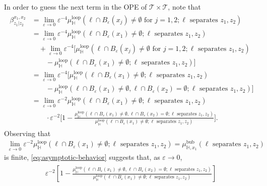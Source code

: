 \documentclass[a4paper,11pt]{article}
\begin{document}
In order to guess the next term in the OPE of $\mathcal{T} \times \mathcal{T}$, note that
\begin{align}
\begin{split}
    \beta^{x_1,x_2}_{z_1|z_2} &= \lim_{\varepsilon \to 0} \varepsilon^{-4} \mu_{\mathbb{H}}^{\text{loop}}(\ell \cap B_{\varepsilon}(x_j) \neq \emptyset \text{ for } j=1,2; \ell \text{ separates } z_1,z_2) \\
    &= \lim_{\varepsilon \to 0} \varepsilon^{-4} \mu_{\mathbb{H}}^{\text{loop}}(\ell \cap B_{\varepsilon}(x_1) \neq \emptyset; \ell \text{ separates } z_1,z_2) \\
    &\quad + \lim_{\varepsilon \to 0} \varepsilon^{-4} \Big[ \mu_{\mathbb{H}}^{\text{loop}}(\ell \cap B_{\varepsilon}(x_j) \neq \emptyset \text{ for } j=1,2; \ell \text{ separates } z_1,z_2) \\
    & \qquad - \mu_{\mathbb{H}}^{\text{loop}}(\ell \cap B_{\varepsilon}(x_1) \neq \emptyset; \ell \text{ separates } z_1,z_2) \Big] \\
    &= \lim_{\varepsilon \to 0} \varepsilon^{-4} \Big[ \mu_{\mathbb{H}}^{\text{loop}}(\ell \cap B_{\varepsilon}(x_1) \neq \emptyset; \ell \text{ separates } z_1,z_2) \\
    & \qquad - \mu_{\mathbb{H}}^{\text{loop}}(\ell \cap B_{\varepsilon}(x_1) \neq \emptyset, \ell \cap B_{\varepsilon}(x_2) = \emptyset ; \ell \text{ separates } z_1,z_2) \Big] \\
    &= \lim_{\varepsilon \to 0} \varepsilon^{-2} \mu_{\mathbb{H}}^{\text{loop}}(\ell \cap B_{\varepsilon}(x_1) \neq \emptyset; \ell \text{ separates } z_1,z_2) \\
    & \qquad \cdot \varepsilon^{-2} \Big[ 1 - \frac{\mu_{\mathbb{H}}^{\text{loop}}(\ell \cap B_{\varepsilon}(x_1) \neq \emptyset, \ell \cap B_{\varepsilon}(x_2) = \emptyset ; \ell \text{ separates } z_1,z_2)}{\mu_{\mathbb{H}}^{\text{loop}}(\ell \cap B_{\varepsilon}(x_1) \neq \emptyset; \ell \text{ separates } z_1,z_2)} \Big].
\end{split}
\end{align}
Observing that
\begin{align}
    \lim_{\varepsilon \to 0} \varepsilon^{-2} \mu_{\mathbb{H}}^{\text{loop}}(\ell \cap B_{\varepsilon}(x_1) \neq \emptyset; \ell \text{ separates } z_1,z_2) = \mu_{\mathbb{H},x_1}^{\text{bub}}(\ell \text{ separates } z_1,z_2)
\end{align}
is finite, \eqref{eq:asymptotic-behavior} suggests that, as $\varepsilon \to 0$,
\begin{align}
\begin{split}
    \varepsilon^{-2} \left[ 1 - \frac{\mu_{\mathbb{H}}^{\text{loop}}(\ell \cap B_{\varepsilon}(x_1) \neq \emptyset, \ell \cap B_{\varepsilon}(x_2) = \emptyset ; \ell \text{ separates } z_1,z_2)}{\mu_{\mathbb{H}}^{\text{loop}}(\ell \cap B_{\varepsilon}(x_1) \neq \emptyset; \ell \text{ separates } z_1,z_2)} \right]
\end{split}
\end{align}
\end{document}
